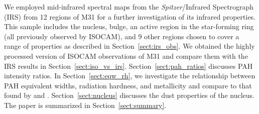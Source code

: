 We employed mid-infrared spectral maps from the {\em Spitzer}/Infrared Spectrograph (IRS) from 12 regions of M31 for a further investigation of 
its infrared properties. This sample includes the nucleus, bulge, an active region in the star-forming ring (all previously observed by ISOCAM), and 9 
other regions chosen to cover a range of properties as described in Section~\ref{sect:irs_obs}. 
We obtained the highly processed version of ISOCAM observations of M31 and compare them with the IRS results in Section~\ref{sect:iso_vs_irs}. 
Section~\ref{sect:pah_ratios} discusses PAH intensity ratios.
In Section~\ref{sect:eqw_rh}, we investigate the relationship between PAH equivalent widths, radiation 
hardness, and metallicity and compare to that found by \citet{Engelbracht_2008} and \citet{Gordon:2008lr}.  
Section~\ref{sect:nucleus} discusses the dust properties of the nucleus. The paper is summarized in Section~\ref{sect:summary}.
